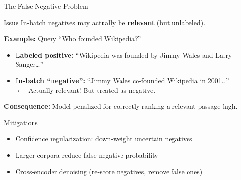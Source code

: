 \documentclass[aspectratio=169]{beamer}
\newif\ifanimated
\newcommand{\cpause}{\ifanimated\pause\fi}
\begin{document}
\begin{frame}{The False Negative Problem}
\begin{alertblock}{Issue}
In-batch negatives may actually be \textbf{relevant} (but unlabeled).
\end{alertblock}

\vspace{0.5em}

\textbf{Example:} Query ``Who founded Wikipedia?''
\begin{itemize}
    \item \textbf{Labeled positive:} ``Wikipedia was founded by Jimmy Wales and Larry Sanger\ldots''
    \item \textbf{In-batch ``negative'':} ``Jimmy Wales co-founded Wikipedia in 2001\ldots''\\
    $\leftarrow$ \textcolor{dense}{Actually relevant! But treated as negative.}
\end{itemize}

\cpause
\vspace{0.5em}

\textbf{Consequence:} Model penalized for correctly ranking a relevant passage high.

\vspace{0.5em}

\begin{exampleblock}{Mitigations}
\begin{itemize}
    \item Confidence regularization: down-weight uncertain negatives
    \item Larger corpora reduce false negative probability
    \item Cross-encoder denoising (re-score negatives, remove false ones)
\end{itemize}
\end{exampleblock}
\end{frame}
\end{document}
